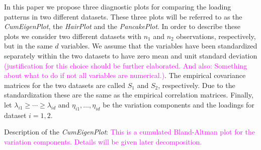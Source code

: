 \documentclass[titlepage,11pt,twoside]{article}
\newcommand{\hl}[1]{\textcolor{magenta}{#1}}
\begin{document}

In this paper we propose three diagnostic plots for comparing the loading patterns in two different datasets. These three plots will be referred to as the \emph{CumEigenPlot}, the \emph{HairPlot} and the \emph{PancakePlot}. In order to describe these plots we consider two different datasets with $n_1$ and $n_2$ observations, respectively, but in the same $d$ variables. We assume that the variables have been standardized separately within the two datasets to have zero mean and unit standard deviation \hl{(justification for this choice should be further elaborated. And also: Something about what to do if not all variables are numerical.)}. The empirical covariance matrices for the two datasets are called $S_1$ and $S_2$, respectively. Due to the standardization these are the same as the empirical correlation matrices. Finally, let $\lambda_{i1} \ge \dotsm \ge \lambda_{id}$ and $\eta_{i1},\dotsc,\eta_{id}$ be the variation components and the loadings for dataset $i=1,2$.

\medskip

Description of the \emph{CumEigenPlot}: \hl{This is a cumulated Bland-Altman plot for the variation components. Details will be given later decomposition.}

\medskip
\end{document}
